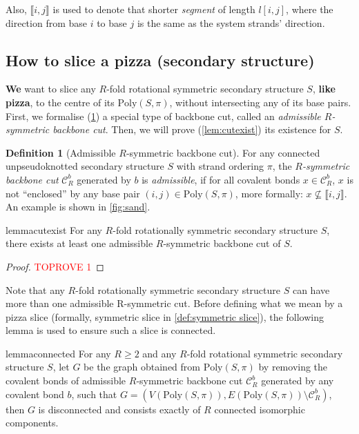 \documentclass[11pt,letterpaper]{article}  \usepackage[margin=1in]{geometry}
\theoremstyle{definition}  \newtheorem{Definition}[theorem]{Definition}
\newcommand{\PolySpi}{\ensuremath{\mathrm{Poly}(S,\pi)}\xspace}
\begin{document}
Also,  $\llbracket i,j \rrbracket$  is used to denote that shorter {\em segment} of length $l[i,j]$, where the direction from base $i$ to base $j$ is the same as the system strands' direction.    

\subsection{How to slice a pizza (secondary structure)}

{\bf We} want to slice any $R$-fold rotational symmetric secondary structure $S$, {\bf like pizza}, to the centre of its $\PolySpi$, without intersecting any of its base pairs. First, we formalise (\cref{def:admissible}) a special type of backbone cut, called an \emph{admissible  $R$-symmetric backbone cut}. Then, we will prove (\cref{lem:cutexist}) its existence for $S$. 

\begin{Definition}[Admissible $R$-symmetric backbone cut] \label{def:admissible}
	For any connected unpseudoknotted secondary structure $S$ with strand ordering $\pi$, the {\em $R$-symmetric backbone cut} $\mathcal{C}_R^b$ generated by $b$ is {\em admissible}, 
	if for all covalent bonds $x \in \mathcal{C}_R^b$,  
	$x$ is not ``enclosed'' by any base pair $(i,j) \in \PolySpi$, more formally:  $x \nsubseteq \llbracket i,j \rrbracket$.   An example is shown in \cref{fig:sand}.
\end{Definition}


\begin{restatable}{lemma}{cutexist} 
	\label{lem:cutexist}
	For any $R$-fold rotationally symmetric secondary structure $S$, there exists at least one admissible $R$-symmetric backbone cut of $S$.
\end{restatable}
\begin{proof}\textcolor{red}{TOPROVE 1}\end{proof}

Note that any $R$-fold rotationally symmetric secondary structure $S$ can have more than one admissible R-symmetric cut. Before defining what we mean by a pizza slice (formally, symmetric slice in \cref{def:symmetric slice}),  the following lemma is used to  ensure such a slice is  connected.

\begin{restatable} {lemma}{connected} 
	\label{lem:connected}
	For any $R\geq 2$ and any $R$-fold rotational symmetric secondary structure $S$, let $G$ be the graph obtained from $\PolySpi$ by removing the covalent bonds of admissible $R$-symmetric backbone cut $\mathcal{C}_R^b$ generated by any covalent bond $b$, such that $G=(V(\PolySpi), E(\PolySpi)\setminus\mathcal{C}_R^b)$, then $G$ is disconnected and consists exactly of $R$ connected isomorphic components.
\end{restatable}  
\end{document}
